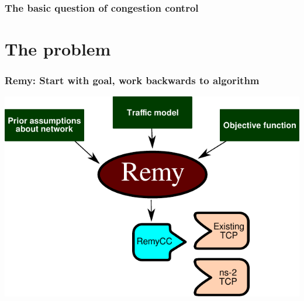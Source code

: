 \documentclass[svgnames]{beamer}
\begin{document}
\begin{frame}
\frametitle{The basic question of congestion control}

\section{The problem}

\begin{centering}

\end{centering}

\end{frame}

\begin{frame}
\frametitle{Remy: Start with goal, work backwards to algorithm}

\begin{centering}
\includegraphics[scale=.6]{remy.pdf}

\end{centering}

\end{frame}
\end{document}
